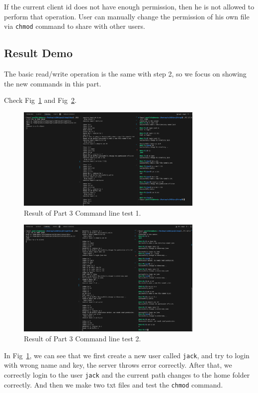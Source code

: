 If the current client id does not have enough permission, then he is not allowed to perform that operation.
User can manually change the permission of his own file via \texttt{chmod} command to share with other users.

\subsection{Result Demo}
The basic read/write operation is the same with step 2, so we focus on showing the new commands in this part. 

Check Fig~\ref{fig:p1} and Fig~\ref{fig:p2}.

\begin{figure}[!h]
    \centering
    \includegraphics[width=0.8\textwidth]{fig/p1.png}
    \caption{Result of Part 3 Command line test 1.}
    \label{fig:p1}
\end{figure}

\begin{figure}[!h]
    \centering
    \includegraphics[width=0.8\textwidth]{fig/p2.png}
    \caption{Result of Part 3 Command line test 2.}
    \label{fig:p2}
\end{figure}

In Fig~\ref{fig:p1}, we can see that we first create a new user called \texttt{jack}, and try 
to login with wrong name and key, the server throws error correctly. After that, we correctly login to the user \texttt{jack} and the current path 
changes to the home folder correctly. And then we make two txt files and test the \texttt{chmod} command. 

